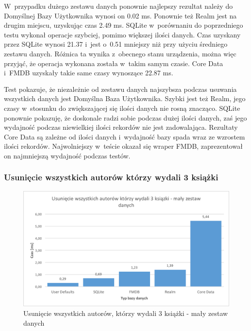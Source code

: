  W~przypadku dużego zestawu danych ponownie najlepszy rezultat należy do Domyślnej Bazy Użytkownika wynosi on 0.02 ms. Ponownie też Realm jest na drugim miejscu, uzyskując czas 2.49 ms. SQLite w~porównaniu do poprzedniego testu wykonał operacje szybciej, pomimo większej ilości danych. Czas uzyskany przez SQLite wynosi 21.37 i~jest o~0.51 mniejszy niż przy użyciu średniego zestawu danych. Różnica ta wynika z~obecnego stanu urządzenia, można więc przyjąć, że operacja wykonana została w~takim samym czasie. Core Data i~FMDB uzyskały takie same czasy wynoszące 22.87 ms. 

Test pokazuje, że niezależnie od zestawu danych najszybsza podczas usuwania wszystkich danych jest Domyślna Baza Użytkownika. Szybki jest też Realm, jego czasy w~stosunku do zwiększającej się ilości danych nie rosną znacząco. SQLite ponownie pokazuję, że doskonale radzi sobie podczas dużej ilości danych, zaś jego wydajność podczas niewielkiej ilości rekordów nie jest zadowalająca. Rezultaty Core Data są zależne od ilości danych i~wydajność bazy spada wraz ze wzrostem ilości rekordów. Najwolniejszy w~teście okazał się wraper FMDB, zaprezentował on najmniejszą wydajność podczas testów. 

\subsubsection{Usunięcie wszystkich autorów którzy wydali 3 książki}

\begin{figure}[H]
    \centering\includegraphics[width=\linewidth]{img/delete_data/delete_by_author/delete_by_author_small_test.png}
    \caption{Usunięcie wszystkich autorów, którzy wydali 3 książki - mały zestaw danych}
    \label{img: delete-by-author-small}
\end{figure}

